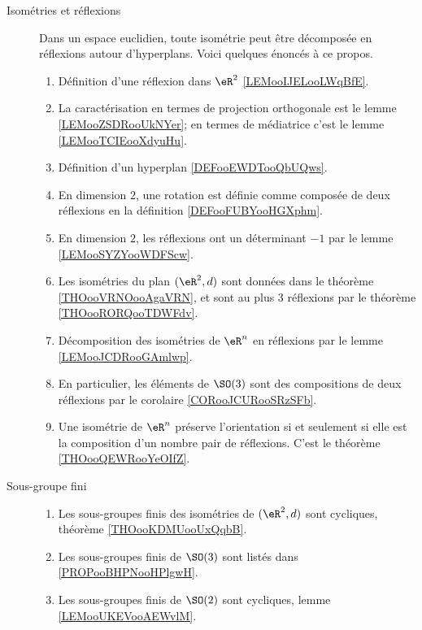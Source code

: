 \begin{description}
	\item[Isométries et réflexions]
		Dans un espace euclidien, toute isométrie peut être décomposée en réflexions autour d'hyperplans. Voici quelques énoncés à ce propos.
		\begin{enumerate}
			\item
			      Définition d'une réflexion dans \( \eR^2\) \ref{LEMooIJELooLWqBfE}.
			\item
			      La caractérisation en termes de projection orthogonale est le lemme \ref{LEMooZSDRooUkNYer}; en termes de médiatrice c'est le lemme \ref{LEMooTCIEooXdyuHu}.
			\item
			      Définition d'un hyperplan \ref{DEFooEWDTooQbUQws}.
			\item
			      En dimension \( 2\), une rotation est définie comme composée de deux réflexions en la définition \ref{DEFooFUBYooHGXphm}.
			\item
			      En dimension \( 2\), les réflexions ont un déterminant \( -1\) par le lemme \ref{LEMooSYZYooWDFScw}.
			\item
			      Les isométries du plan \( (\eR^2,d)\) sont données dans le théorème \ref{THOooVRNOooAgaVRN}, et sont au plus 3 réflexions par le théorème \ref{THOooRORQooTDWFdv}.
			\item
			      Décomposition des isométries de \( \eR^n\) en réflexions par le lemme \ref{LEMooJCDRooGAmlwp}.
			\item
			      En particulier, les éléments de \( \SO(3)\) sont des compositions de deux réflexions par le corolaire \ref{CORooJCURooSRzSFb}.
			\item
			      Une isométrie de \( \eR^n\) préserve l'orientation si et seulement si elle est la composition d'un nombre pair de réflexions. C'est le théorème \ref{THOooQEWRooYeOIfZ}.
		\end{enumerate}
	\item[Sous-groupe fini]
		\begin{enumerate}
			\item
			      Les sous-groupes finis des isométries de \( (\eR^2,d)\) sont cycliques, théorème \ref{THOooKDMUooUxQqbB}.
			\item
			      Les sous-groupes finis de \( \SO(3)\) sont listés dans \ref{PROPooBHPNooHPlgwH}.
			\item
			      Les sous-groupes finis de \( \SO(2)\) sont cycliques, lemme \ref{LEMooUKEVooAEWvlM}.
		\end{enumerate}
\end{description}

